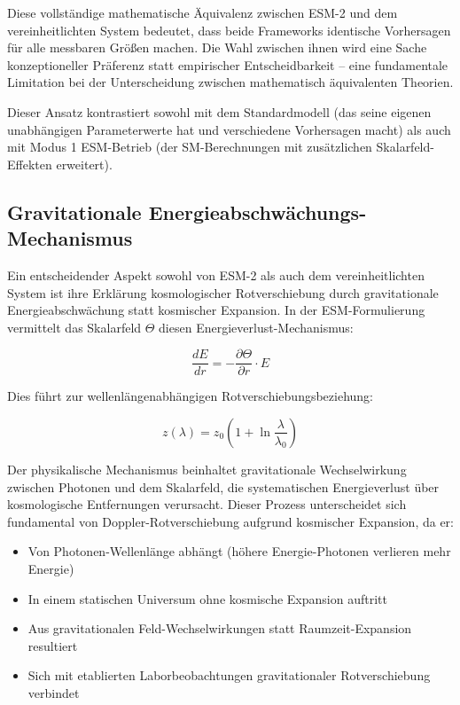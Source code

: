 \documentclass[12pt,a4paper]{article}
\begin{document}
	Diese vollständige mathematische Äquivalenz zwischen ESM-2 und dem vereinheitlichten System bedeutet, dass beide Frameworks identische Vorhersagen für alle messbaren Größen machen. Die Wahl zwischen ihnen wird eine Sache konzeptioneller Präferenz statt empirischer Entscheidbarkeit – eine fundamentale Limitation bei der Unterscheidung zwischen mathematisch äquivalenten Theorien.
	
	Dieser Ansatz kontrastiert sowohl mit dem Standardmodell (das seine eigenen unabhängigen Parameterwerte hat und verschiedene Vorhersagen macht) als auch mit Modus 1 ESM-Betrieb (der SM-Berechnungen mit zusätzlichen Skalarfeld-Effekten erweitert).
	
	\subsection{Gravitationale Energieabschwächungs-Mechanismus}
	\label{subsec:gravitational_energy_attenuation}
	
	Ein entscheidender Aspekt sowohl von ESM-2 als auch dem vereinheitlichten System ist ihre Erklärung kosmologischer Rotverschiebung durch gravitationale Energieabschwächung statt kosmischer Expansion. In der ESM-Formulierung vermittelt das Skalarfeld $\Theta$ diesen Energieverlust-Mechanismus:
	
	\begin{equation}
		\frac{dE}{dr} = -\frac{\partial \Theta}{\partial r} \cdot E
	\end{equation}
	
	Dies führt zur wellenlängenabhängigen Rotverschiebungsbeziehung:
	
	\begin{equation}
		z(\lambda) = z_0\left(1 + \ln\frac{\lambda}{\lambda_0}\right)
	\end{equation}
	
	Der physikalische Mechanismus beinhaltet gravitationale Wechselwirkung zwischen Photonen und dem Skalarfeld, die systematischen Energieverlust über kosmologische Entfernungen verursacht. Dieser Prozess unterscheidet sich fundamental von Doppler-Rotverschiebung aufgrund kosmischer Expansion, da er:
	
	\begin{itemize}
		\item Von Photonen-Wellenlänge abhängt (höhere Energie-Photonen verlieren mehr Energie)
		\item In einem statischen Universum ohne kosmische Expansion auftritt
		\item Aus gravitationalen Feld-Wechselwirkungen statt Raumzeit-Expansion resultiert
		\item Sich mit etablierten Laborbeobachtungen gravitationaler Rotverschiebung verbindet
	\end{itemize}
	
\end{document}
